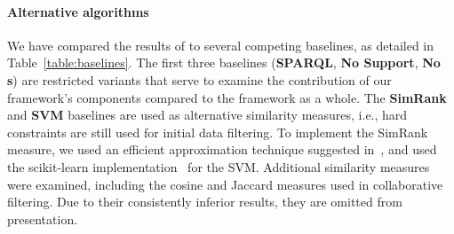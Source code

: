 \paragraph*{Alternative algorithms} \label{setup}
We have compared the results of \qlang{} to several competing baselines, as detailed in Table~\ref{table:baselines}. The first three baselines (\textbf{SPARQL}, \textbf{No Support}, \textbf{No \Fset{}s}) are restricted variants that serve to examine the contribution of our framework's components compared to the framework as a whole.
The \textbf{SimRank} and \textbf{SVM} baselines are used as alternative similarity measures, i.e., hard constraints are still used for initial data filtering. To implement the SimRank measure, we used an efficient approximation technique suggested in~\cite{tian2016sling}, and used the scikit-learn implementation~\cite{SVM} for the SVM. 
Additional similarity measures were examined, including the cosine and Jaccard
measures used in collaborative filtering. Due to their consistently inferior results, they are omitted from presentation.



